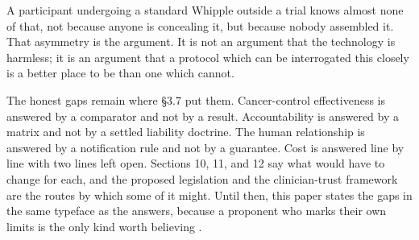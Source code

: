 A participant undergoing a standard Whipple outside a trial knows almost none of
that, not because anyone is concealing it, but because nobody assembled it. That
asymmetry is the argument. It is not an argument that the technology is
harmless; it is an argument that a protocol which can be interrogated this
closely is a better place to be than one which cannot.

The honest gaps remain where \S 3.7 put them. Cancer-control effectiveness is
answered by a comparator and not by a result. Accountability is answered by a
matrix and not by a settled liability doctrine. The human relationship is
answered by a notification rule and not by a guarantee. Cost is answered line by
line with two lines left open. Sections 10, 11, and 12 say what would have to
change for each, and the proposed legislation \cite{hr9510billv5} and the
clinician-trust framework \cite{clintrustpai} are the routes by which some of it
might. Until then, this paper states the gaps in the same typeface as the
answers, because a proponent who marks their own limits is the only kind worth
believing \cite{onpremwhippl}.
